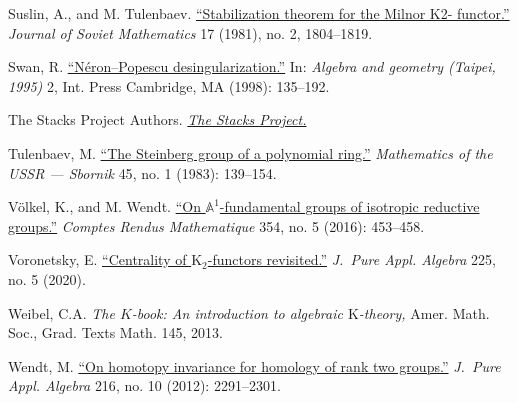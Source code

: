 \documentclass[oneside, 11pt]{amsart}
\numberwithin{equation}{section}
\newcommand{\K}{{\mathrm{K}}}
\theoremstyle{definition}
\theoremstyle{definition}
\theoremstyle{remark}
\begin{document}
\begin{thebibliography}{0}
Suslin, A., and M. Tulenbaev.
\href{https://dx.doi.org/10.1007/BF01091768}{``Stabilization theorem for the Milnor K2-
functor.''} \textit{Journal of Soviet Mathematics} 17 (1981), no. 2, {1804--1819}.

Swan, R.
\href{http://hlombardi.free.fr/Swan-NeronPopescu.pdf}{``N{\'e}ron--Popescu desingularization.''}
In: \textit{Algebra and geometry (Taipei, 1995)} 2, Int. Press Cambridge, MA (1998): 135--192.

The Stacks Project Authors.
\href{https://stacks.math.columbia.edu}{\textit{The Stacks Project.}}

Tulenbaev, M.
\href{http://dx.doi.org/10.1070/SM1983v045n01ABEH002591}{``The Steinberg group of a polynomial ring.''}
\textit{Mathematics of the USSR --- Sbornik} {45}, no. {1} (1983): {139--154}.
  
V\"olkel, K., and M. Wendt.
\href{http://dx.doi.org/10.1016/j.crma.2016.01.026}{``On $\mathbb{A}^1$-fundamental groups of isotropic reductive groups.''}
\textit{Comptes Rendus Mathematique} 354, no. 5 (2016): 453--458.

Voronetsky, E.
\href{http://dx.doi.org/10.1016/j.jpaa.2020.106547}{``Centrality of $\K_2$-functors revisited.''}
\textit{J.~Pure Appl. Algebra} 225, no. 5 (2020).

Weibel, C.A.
\textit{The $K$-book: An introduction to algebraic $\K$-theory,}
Amer. Math. Soc., Grad. Texts Math. 145, 2013.

Wendt, M.
\href{http://dx.doi.org/10.1016/j.jpaa.2012.03.004}{``On homotopy invariance for homology of rank two groups.''}
\textit{J.~Pure Appl. Algebra} {216}, no. {10} (2012): {2291--2301}.
\end{thebibliography}
\end{document}
